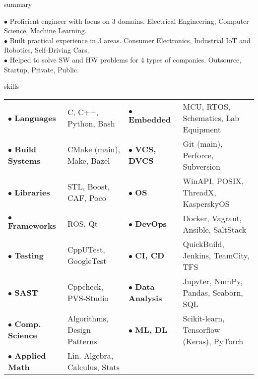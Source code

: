 \documentclass{template}
\begin{document}
\begin{rSection}{summary}

$\bullet$ Proficient engineer with focus on 3 domains. Electrical Engineering, Computer Science, Machine Learning. \\
$\bullet$ Built practical experience in 3 areas. Consumer Electronics, Industrial IoT and Robotics, Self-Driving Cars. \\
$\bullet$ Helped to solve SW and HW problems for 4 types of companies. Outsource, Startup, Private, Public.

\end{rSection}

\begin{rSection}{skills}
\begin{tabular}{llll}

$\bullet$ \textbf{Languages}     & C, C++, Python, Bash          & $\bullet$ \textbf{Embedded}      & MCU, RTOS, Schematics, Lab Equipment \\
$\bullet$ \textbf{Build Systems} & CMake (main), Make, Bazel     & $\bullet$ \textbf{VCS, DVCS}     & Git (main), Perforce, Subversion \\
$\bullet$ \textbf{Libraries}     & STL, Boost, CAF, Poco         & $\bullet$ \textbf{OS}            & WinAPI, POSIX, ThreadX, KasperskyOS \\
$\bullet$ \textbf{Frameworks}    & ROS, Qt                       & $\bullet$ \textbf{DevOps}        & Docker, Vagrant, Ansible, SaltStack  \\
$\bullet$ \textbf{Testing}       & CppUTest, GoogleTest          & $\bullet$ \textbf{CI, CD}        & QuickBuild, Jenkins, TeamCity, TFS \\
$\bullet$ \textbf{SAST}          & Cppcheck, PVS‑Studio          & $\bullet$ \textbf{Data Analysis} & Jupyter, NumPy, Pandas, Seaborn, SQL \\
$\bullet$ \textbf{Comp. Science} & Algorithms, Design Patterns   & $\bullet$ \textbf{ML, DL}        & Scikit-learn, Tensorflow (Keras), PyTorch \\
$\bullet$ \textbf{Applied Math}  & Lin. Algebra, Calculus, Stats \\

\end{tabular}
\end{rSection}
\end{document}
